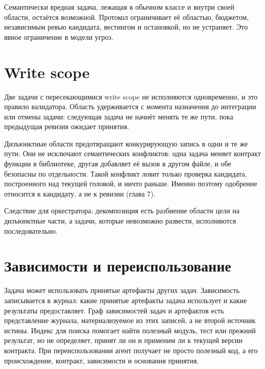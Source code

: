 \begin{warnbox}
Семантически вредная задача, лежащая в обычном классе и внутри своей области, остаётся возможной. Протокол ограничивает её областью, бюджетом, независимым ревью кандидата, вестингом и остановкой, но не устраняет. Это явное ограничение в модели угроз.
\end{warnbox}

\section{Write scope}

Две задачи с пересекающимися write scope не исполняются одновременно, и это правило валидатора. Область удерживается с момента назначения до интеграции или отмены задачи: следующая задача не начнёт менять те же пути, пока предыдущая ревизия ожидает принятия.

\begin{warnbox}
Дизъюнктные области предотвращают конкурирующую запись в одни и те же пути. Они не исключают семантических конфликтов: одна задача меняет контракт функции в библиотеке, другая добавляет её вызов в другом файле, и обе безопасны по отдельности. Такой конфликт ловит только проверка кандидата, построенного над текущей головой, и ничто раньше. Именно поэтому одобрение относится к кандидату, а не к ревизии (глава 7).
\end{warnbox}

Следствие для оркестратора: декомпозиция есть разбиение области цели на дизъюнктные части, а задачи, которые невозможно развести, исполняются последовательно.

\section{Зависимости и переиспользование}

Задача может использовать принятые артефакты других задач. Зависимость записывается в журнал: какие принятые артефакты задача использует и какие результаты предоставляет. Граф зависимостей задач и артефактов есть представление журнала, материализуемое из этих записей, а не второй источник истины. Индекс для поиска помогает найти полезный модуль, тест или прежний результат, но не определяет, принят ли он и применим ли к текущей версии контракта. При переиспользовании агент получает не просто полезный код, а его происхождение, контракт, зависимости и основания принятия.


